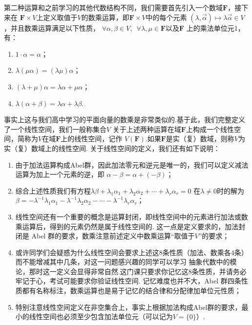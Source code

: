 第二种运算和之前学习的其他代数结构不同，我们需要首先引入一个数域$\mathbf{F}$，接下来在
$\mathbf{F}\times V$上定义取值于$V$的数乘运算，即$\mathbf{F}\times V$中的每个元素
$(\lambda,\vec{\alpha})\mapsto \lambda\vec{\alpha}\in V$，并且数乘运算满足以下性质，
$\forall \alpha,\beta \in V,\enspace\forall \lambda,\mu\in\mathbf{F}$以及$\mathbf{F}$
上的乘法单位元1，有：
\begin{enumerate}
    \item $1\cdot \alpha=\alpha$；

    \item $\lambda(\mu\alpha)=(\lambda\mu)\alpha$；

    \item $(\lambda+\mu)\alpha=\lambda\alpha+\mu\alpha$；

    \item $\lambda(\alpha+\beta)=\lambda\alpha+\lambda\beta$.
\end{enumerate}

事实上这与我们高中学习的平面向量的数乘是非常类似的.基于此，我们完整定义了一个线性空间，我们一般称集合$V$
关于上述两种运算在域$\mathbf{F}$上构成一个线性空间，简称为$V$在域$\mathbf{F}$上的线性空间，记作
$V(\mathbf{F})$.如果$\mathbf{F}$是实（复）数域，则称$V$为实（复）数域上的线性空间.
关于线性空间的定义，我们还有如下说明：
\begin{enumerate}
    \item 由于加法运算构成Abel群，因此加法零元和逆元是唯一的，我们可以定义减法运算为加上一个元素的逆，即
    $\alpha-\beta=\alpha+(-\beta)$；
    \item 综合上述性质我们有方程$\lambda\beta+\lambda_1\alpha_1+\lambda_2\alpha_2+\cdots+\lambda_r\alpha_r=0$
    在$\lambda\neq 0$时的解为$\beta=-\lambda^{-1}\lambda_1\alpha_1-\lambda^{-1}\lambda_2\alpha_2-\cdots-\lambda^{-1}\lambda_r\alpha_r$；
    \item 线性空间还有一个重要的概念是运算封闭，即线性空间中的元素进行加法或数乘运算后，得到的元素仍然是属于线性空间的.
    这一点是定义要求的，加法封闭是 Abel 群的要求，数乘注意前述定义中数乘运算``取值于$V$''的要求；
    \item 或许同学们会疑惑为什么线性空间会要求上述这8条性质（加法、数乘各4条）而不能增减其中几条，对这一问题感兴趣的同学可以学习
    抽象代数中的模论，那时这一定义会显得非常自然.这门课只要求你记忆这8条性质，并请务必牢记于心，考试可能要求你验证线性空间.
    记忆难度也并不大，Abel 群四条性质都有名称标注，数乘运算也是易于记忆的结合律和分配律加单位元性质；
    \item 特别注意线性空间定义在非空集合上，事实上根据加法构成Abel群的要求，最小的线性空间也必须至少包含加法单位元（可以记为$V=\{0\}$）.
\end{enumerate}

